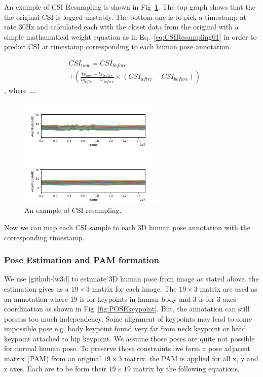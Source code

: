 \documentclass[10pt,letterpaper]{article}
\begin{document}
An example of CSI Resampling is shown in Fig~\ref{fig:CSIResampling01}. The top graph shows that the the original CSI is logged unstably. The bottom one is to pick a timestamp at rate 30Hz and calculated each with the closet data from the original with a simple mathamatical weight equation as in Eq.~\ref{eq:CSIResampling01} in order to predict CSI at timestamp corresponding to each human pose annotation.

\begin{equation}
\begin{aligned}
& CSI_{now} = CSI_{before} \\ 
& + \left(  \frac{ts_{now}-ts_{before}}{ts_{after}-ts_{before}}  \times (CSI_{after}-CSI_{before})   \right)
\label{eq:CSIResampling01}
\end{aligned}
\end{equation},
where ....

\begin{figure}[htbp]
	\centerline{\includegraphics[width=70mm,scale=0.5]{CSIResampling01.png}}
	\caption{An example of CSI resampling.}
	\label{fig:CSIResampling01}
\end{figure}

Now we can map each CSI sample to each 3D human pose annotation with the corresponding timestamp.


\subsubsection*{Pose Estimation and PAM formation}

We use [github-lw3d] to estimate 3D human pose from image as stated above. the estimation gives us a $19 \times 3$ matrix for each image. The $19 \times 3$ matrix are used as an annotation where $19$ is for keypoints in human body and $3$ is for 3 axes coordination as shown in Fig~\ref{fig:POSEkeypoint}. But, the annotation can still possess too much independency. Some alignment of keypoints may lead to some impossible pose e.g. body keypoint found very far from neck keypoint or head keypoint attached to hip keypoint. We assume those poses are quite not possible for normal human pose. To preserve those constraints, we form a pose adjacent matrix (PAM) from an original $19\times3$ matrix. the PAM is applied for all x, y and z axes. Each are to be form their $19\times19$ matrix by the following equations.
\end{document}
